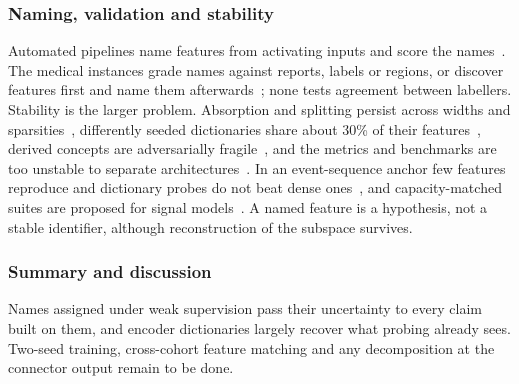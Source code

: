 \subsubsection{Naming, validation and stability}

Automated pipelines name features from activating inputs and score the
names~\cite{paulo2024automatically}. The medical instances grade names against reports, labels or
regions, or discover features first and name them
afterwards~\cite{bouzid2025insights,abdulaal2024an,haque2026medconcept,nakka2025mammosae,rao2024discover};
none tests agreement between labellers. Stability is the larger problem. Absorption and splitting persist
across widths and sparsities~\cite{chanin2024a}, differently seeded dictionaries share about 30\% of
their features~\cite{paulo2025sparse}, derived concepts are adversarially fragile~\cite{li2025evaluating},
and the metrics and benchmarks are too unstable to separate
architectures~\cite{chanin2026are,chanin2026synthsaebench}. In an event-sequence anchor few features
reproduce and dictionary probes do not beat dense ones~\cite{sainsbury2026sparse}, and capacity-matched
suites are proposed for signal models~\cite{duan2026ecginterpbench}. A named feature is a hypothesis, not
a stable identifier, although reconstruction of the subspace survives.

\subsubsection{Summary and discussion}

Names assigned under weak supervision pass their uncertainty to every claim built on them, and encoder
dictionaries largely recover what probing already sees. Two-seed training, cross-cohort feature matching
and any decomposition at the connector output remain to be done.
